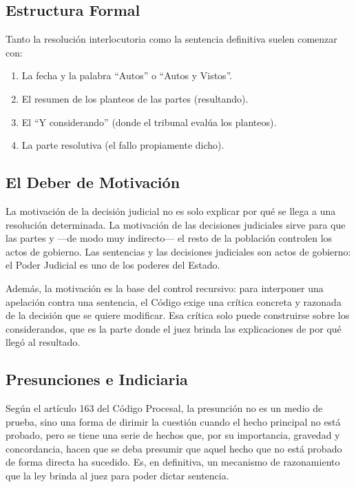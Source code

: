 \documentclass[12pt,oneside]{book}
\begin{document}
\subsection{Estructura Formal}

Tanto la resolución interlocutoria como la sentencia definitiva suelen comenzar con:

\begin{enumerate}
    \item La fecha y la palabra ``Autos'' o ``Autos y Vistos''.
    \item El resumen de los planteos de las partes (resultando).
    \item El ``Y considerando'' (donde el tribunal evalúa los planteos).
    \item La parte resolutiva (el fallo propiamente dicho).
\end{enumerate}

\subsection{El Deber de Motivación}

\begin{important}
La motivación de la decisión judicial no es solo explicar por qué se llega a una resolución determinada. La motivación de las decisiones judiciales sirve para que las partes y —de modo muy indirecto— el resto de la población controlen los actos de gobierno. Las sentencias y las decisiones judiciales son actos de gobierno: el Poder Judicial es uno de los poderes del Estado.
\end{important}

Además, la motivación es la base del control recursivo: para interponer una apelación contra una sentencia, el Código exige una crítica concreta y razonada de la decisión que se quiere modificar. Esa crítica solo puede construirse sobre los considerandos, que es la parte donde el juez brinda las explicaciones de por qué llegó al resultado.

\subsection{Presunciones e Indiciaria}

Según el artículo 163 del Código Procesal, la presunción no es un medio de prueba, sino una forma de dirimir la cuestión cuando el hecho principal no está probado, pero se tiene una serie de hechos que, por su importancia, gravedad y concordancia, hacen que se deba presumir que aquel hecho que no está probado de forma directa ha sucedido. Es, en definitiva, un mecanismo de razonamiento que la ley brinda al juez para poder dictar sentencia.
\end{document}
